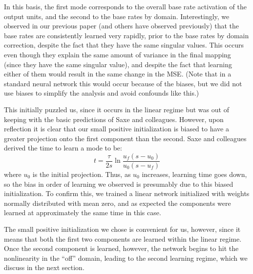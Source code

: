 \documentclass[11pt]{article}
\begin{document}
In this basis, the first mode corresponds to the overall base rate activation of the output units, and the second to the base rates by domain. Interestingly, we observed in our previous paper (and others have observed previously) that the base rates are consistently learned very rapidly, prior to the base rates by domain correction, despite the fact that they have the same singular values. This occurs even though they explain the same amount of variance in the final mapping (since they have the same singular value), and despite the fact that learning either of them would result in the same change in the MSE. (Note that in a standard neural network this would occur because of the biases, but we did not use biases to simplify the analysis and avoid confounds like this.) \par 
This initially puzzled us, since it occurs in the linear regime but was out of keeping with the basic predictions of Saxe and colleagues. However, upon reflection it is clear that our small positive initialization is biased to have a greater projection onto the first component than the second. Saxe and colleagues derived the time to learn a mode to be:
\[t = \frac{\tau}{2s} \ln \frac{u_f(s-u_0)}{u_0(s-u_f)}\]
where \(u_0\) is the initial projection. Thus, as \(u_0\) increases, learning time goes down, so the bias in order of learning we observed is presumably due to this biased initialization. To confirm this, we trained a linear network initialized with weights normally distributed with mean zero, and as expected the components were learned at approximately the same time in this case. \par
The small positive initialization we chose is convenient for us, however, since it means that both the first two components are learned within the linear regime. Once the second component is learned, however, the network begins to hit the nonlinearity in the ``off'' domain, leading to the second learning regime, which we discuss in the next section.\par
\end{document}
